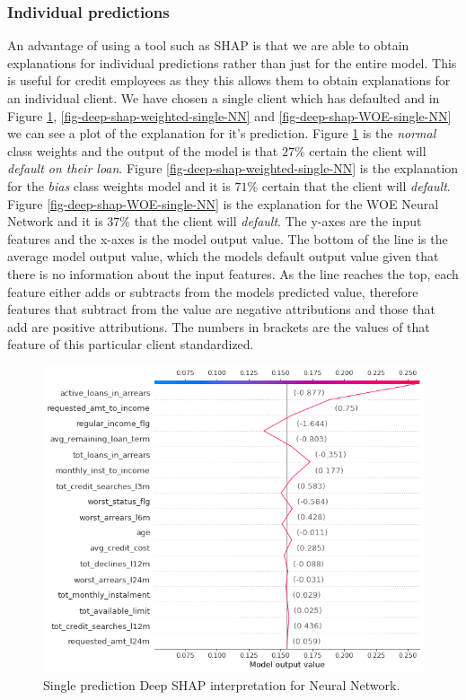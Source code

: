 \subsubsection{Individual predictions}
An advantage of using a tool such as SHAP is that we are able to obtain explanations for individual predictions rather than just for the entire model. This is useful for credit employees as they this allows them to obtain explanations for an individual client. We have chosen a single client which has defaulted and in Figure \ref{fig-deep-shap-single-NN}, \ref{fig-deep-shap-weighted-single-NN} and \ref{fig-deep-shap-WOE-single-NN} we can see a plot of the explanation for it's prediction. Figure \ref{fig-deep-shap-single-NN} is the \emph{normal} class weights and the output of the model is that $27\%$ certain the client will \emph{default on their loan}. Figure \ref{fig-deep-shap-weighted-single-NN} is the explanation for the \emph{bias} class weights model and it is $71\%$ certain that the client will \emph{default}. Figure \ref{fig-deep-shap-WOE-single-NN} is the explanation for the WOE Neural Network and it is $37\%$ that the client will \emph{default}. The y-axes are the input features and the x-axes is the model output value. The bottom of the line is the average model output value, which the models default output value given that there is no information about the input features. As the line reaches the top, each feature either adds or subtracts from the models predicted value, therefore features that subtract from the value are negative attributions and those that add are positive attributions. The numbers in brackets are the values of that feature of this particular client standardized.

\begin  {figure}[!htpb]
\centering
  \includegraphics[width=0.8\linewidth]{Credit_Images/shap-nn-single.png}
   \caption{Single prediction Deep SHAP interpretation for Neural Network.}
    \label{fig-deep-shap-single-NN}
\end{figure}

